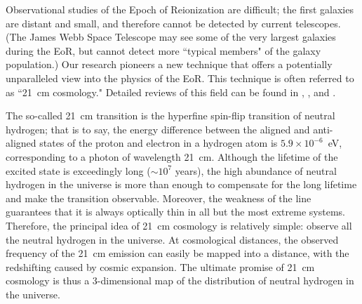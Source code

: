 Observational studies of the Epoch of Reionization are difficult; the first galaxies are distant and small,
and therefore cannot be detected by current telescopes.  (The James Webb Space Telescope may see some
of the very largest galaxies during the EoR, but cannot detect more ``typical members" of the galaxy population.)
Our research pioneers a new technique that offers a potentially unparalleled view into the physics of the EoR.
This technique is often referred to as ``21\ cm cosmology."
Detailed reviews of this field can be found in \cite{furlanetto_et_al_2006},
\cite{morales_and_wyithe_2011}, and \cite{pritchard_and_loeb_2012}.

The so-called 21\ cm transition is the hyperfine spin-flip transition
of neutral hydrogen; that is to say, the energy difference between 
the aligned and anti-aligned states of the proton and electron in a hydrogen atom
is $5.9\times10^{-6}$~eV, corresponding to a photon of wavelength 21\ cm.
Although the lifetime of the excited state is exceedingly long ($\sim10^7$ years),
the high abundance of neutral hydrogen in the universe is more than enough
to compensate for the long lifetime and make the transition observable.
Moreover, the weakness of the line guarantees that it is always
optically thin in all but the most extreme systems.  Therefore, the principal
idea of 21\ cm cosmology is relatively simple: observe all the neutral hydrogen
in the universe.  At cosmological distances, the observed frequency of
the 21\ cm emission can easily be mapped into a distance, with the redshifting
caused by cosmic expansion.  The ultimate promise of 21\ cm cosmology
is thus a 3-dimensional map of the distribution of neutral hydrogen in the
universe.

